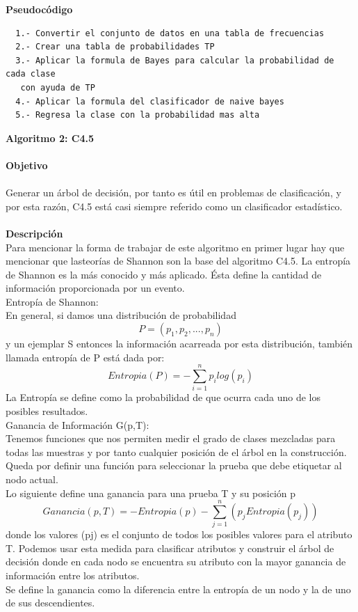 \documentclass{article}
\begin{document}
{\bf Pseudocódigo}
\begin{verbatim}
  1.- Convertir el conjunto de datos en una tabla de frecuencias
  2.- Crear una tabla de probabilidades TP
  3.- Aplicar la formula de Bayes para calcular la probabilidad de cada clase
   con ayuda de TP
  4.- Aplicar la formula del clasificador de naive bayes
  5.- Regresa la clase con la probabilidad mas alta
\end{verbatim}

{\bf Algoritmo 2: C4.5}\\\\
{\bf Objetivo}\\\\
Generar un árbol de decisión, por tanto es útil en problemas de clasificación, y por esta razón, C4.5 está casi siempre referido como un clasificador estadístico.\\\\
 {\bf Descripción}\\
 Para mencionar la forma de trabajar de este algoritmo en primer lugar hay que mencionar que lasteorías de Shannon son la base del algoritmo C4.5. La entropía de Shannon es la más conocido y más aplicado. Ésta define la cantidad de información proporcionada por un evento.\\

Entropía de Shannon:\\
En general, si damos una distribución de probabilidad \[P = (p_1, p_2,..., p_n)\] y un ejemplar S entonces la información acarreada por esta distribución, también llamada entropía de P está dada por:\\
 \begin{equation*}
 Entropia(P) = -\sum_{i=1}^{n}p_ilog(p_i)
 \end{equation*}
La Entropía se define como  la probabilidad de que ocurra cada uno de los posibles resultados.\\

Ganancia de Información G(p,T):\\
Tenemos funciones que nos permiten medir el grado de clases mezcladas para todas las muestras y por tanto cualquier posición de el árbol en la construcción. Queda por definir una función para seleccionar la prueba que debe etiquetar al nodo actual.\\
Lo siguiente define una ganancia para una prueba T y su posición p
 \begin{equation*}
 Ganancia(p,T) = -Entropia(p) - \sum_{j=1}^{n}(p_jEntropia(p_j))
 \end{equation*}
donde los valores (pj) es el conjunto de todos los posibles valores para el atributo T.
Podemos usar esta medida para clasificar atributos y construir el árbol de decisión donde en cada nodo se encuentra su atributo con la mayor ganancia de información entre los atributos.\\
Se define la ganancia como la diferencia entre la entropía de un nodo y la de uno de sus descendientes.\\\
\end{document}

